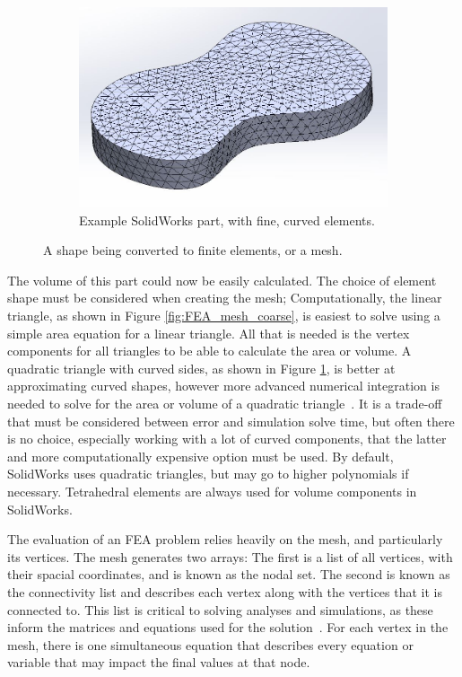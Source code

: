 \begin{figure}
\begin{subfigure}[h]{0.6\textwidth}
        \includegraphics[width=\textwidth]{chap3_images/mesh_test_part_fine_mesh.JPG}
        \caption{Example SolidWorks part, with fine, curved elements.}
        \label{fig:FEA_mesh_fine}
    \end{subfigure}
    \caption{A shape being converted to finite elements, or a mesh.}
    \label{FEA_mesh_example}
\end{figure}

The volume of this part could now be easily calculated. The choice of element shape must be considered when creating the mesh; Computationally, the linear triangle, as shown in Figure \ref{fig:FEA_mesh_coarse}, is easiest to solve using a simple area equation for a linear triangle. All that is needed is the vertex components for all triangles to be able to calculate the area or volume. A quadratic triangle with curved sides, as shown in Figure \ref{fig:FEA_mesh_fine}, is better at approximating curved shapes, however more advanced numerical integration is needed to solve for the area or volume of a quadratic triangle~\citep{FEA_SW}. It is a trade-off that must be considered between error and simulation solve time, but often there is no choice, especially working with a lot of curved components, that the latter and more computationally expensive option must be used. By default, SolidWorks uses quadratic triangles, but may go to higher polynomials if necessary. Tetrahedral elements are always used for volume components in SolidWorks. 

The evaluation of an FEA problem relies heavily on the mesh, and particularly its vertices. The mesh generates two arrays: The first is a list of all vertices, with their spacial coordinates, and is known as the nodal set. The second is known as the connectivity list and describes each vertex along with the vertices that it is connected to. This list is critical to solving analyses and simulations, as these inform the matrices and equations used for the solution~\citep{FEA_SW}. For each vertex in the mesh, there is one simultaneous equation that describes every equation or variable that may impact the final values at that node. 

